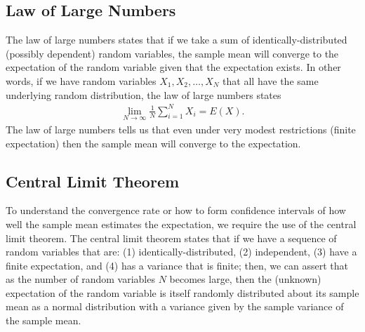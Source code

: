 \subsection{Law of Large Numbers}

The law of large numbers states that if we take a sum of identically-distributed (possibly dependent) random variables, the sample mean will converge to the expectation of the random variable given that the expectation exists. In other words, if we have random variables $X_1, X_2, \ldots, X_N$ that all have the same underlying random distribution, the law of large numbers states
\begin{align}
  \lim_{N \rightarrow \infty} \frac{1}{N} \sum_{i=1}^N X_i = E(X) .
\end{align}
The law of large numbers tells us that even under very modest restrictions (finite expectation) then the sample mean will converge to the expectation. 

\subsection{Central Limit Theorem}

To understand the convergence rate or how to form confidence intervals of how well the sample mean estimates the expectation, we require the use of the central limit theorem. The central limit theorem states that if we have a sequence of random variables that are: (1) identically-distributed, (2) independent, (3) have a finite expectation, and (4) has a variance that is finite; then, we can assert that as the number of random variables $N$ becomes large, then the (unknown) expectation of the random variable is itself randomly distributed about its sample mean as a normal distribution with a variance given by the sample variance of the sample mean. 

